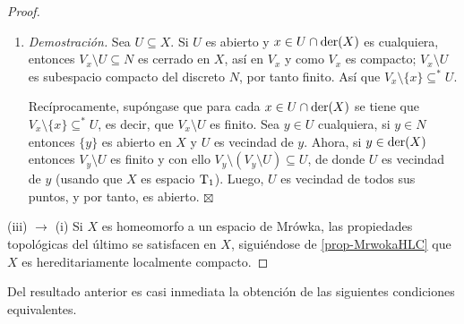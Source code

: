 \begin{proof}
\begin{enumerate}[\hspace{1.5 cm}, listparindent=1.5em]
		\item \textit{Demostración.} Sea $U \subseteq X$. Si $U$ es abierto y $x \in U \cap \operatorname{der}(X)$ es cualquiera, entonces $V_x \setminus U \subseteq N$ es cerrado en $X$, así en $V_x$ y como $V_x$ es compacto; $V_x \setminus U$ es subespacio compacto del discreto $N$, por tanto finito. Así que $V_x \setminus \{x\} \subseteq^* U$.

		      Recíprocamente, supóngase que para cada $x \in U \cap \operatorname{der}(X)$ se tiene que $V_x \setminus \{x\} \subseteq^* U$, es decir, que $V_x \setminus U$ es finito. Sea $y \in U$ cualquiera, si $y \in N$ entonces $\{y\}$ es abierto en $X$ y $U$ es vecindad de $y$. Ahora, si $y \in \operatorname{der}(X)$ entonces $V_y \setminus U$ es finito y con ello $V_y \setminus (V_y \setminus U) \subseteq U$, de donde $U$ es vecindad de $y$ (usando que $X$ es espacio $\operatorname{T}_1$). Luego, $U$ es vecindad de todos sus puntos, y por tanto, es abierto. \hfill$\boxtimes$
	\end{enumerate}

	(iii) $\rightarrow$ (i) Si $X$ es homeomorfo a un espacio de Mrówka, las propiedades topológicas del último se satisfacen en $X$, siguiéndose de \ref{prop-MrwokaHLC} que $X$ es hereditariamente localmente compacto.
\end{proof}

Del resultado anterior es casi inmediata la obtención de las siguientes condiciones equivalentes.

